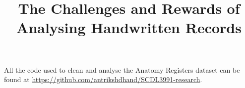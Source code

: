 \documentclass[
    a4paper, 
    stu,
    biblatex,
    helv,
    floatsintext,
    11pt,
]{apa7}
\title{The Challenges and Rewards of Analysing Handwritten Records}
\begin{document}

\maketitle



\newpage

\newpage

\newpage




\nocite{*} %
\printbibliography


\appendix

\section{}

All the code used to clean and analyse the Anatomy Registers dataset can be found at \url{https://github.com/antrikshdhand/SCDL3991-research}.
\end{document}
